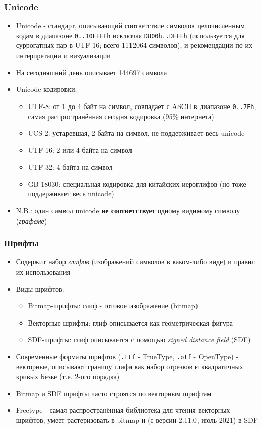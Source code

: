 \documentclass{beamer}
\begin{document}
\begin{frame}[fragile]
\frametitle{Unicode}
\begin{itemize}
\item Unicode - стандарт, описывающий соответствие символов целочисленным кодам в диапазоне \verb|0..10FFFFh| исключая \verb|D800h..DFFFh| (используется для суррогатных пар в UTF-16; всего 1112064 символов), и рекомендации по их интерпретации и визуализации
\pause
\item На сегодняшний день описывает 144697 символа
\pause
\item Unicode-кодировки:
\pause
\begin{itemize}
\item UTF-8: от 1 до 4 байт на символ, совпадает с ASCII в диапазоне \verb|0..7Fh|, самая распространённая сегодня кодировка (95\% интернета)
\pause
\item UCS-2: устаревшая, 2 байта на символ, не поддерживает весь unicode
\pause
\item UTF-16: 2 или 4 байта на символ
\pause
\item UTF-32: 4 байта на символ
\pause
\item GB 18030: специальная кодировка для китайских иероглифов (но тоже поддерживает весь unicode)
\end{itemize}
\pause
\item N.B.: один символ unicode \textbf{не соответствует} одному видимому символу (\textit{графеме})
\end{itemize}
\end{frame}

\begin{frame}[fragile]
\frametitle{Шрифты}
\begin{itemize}
\item Содержит набор \textit{глифов} (изображений символов в каком-либо виде) и правил их использования
\pause
\item Виды шрифтов:
\pause
\begin{itemize}
\item Bitmap-шрифты: глиф - готовое изображение (bitmap)
\pause
\item Векторные шрифты: глиф описывается как геометрическая фигура
\pause
\item SDF-шрифты: глиф описывается с помощью \textit{signed distance field} (SDF)
\end{itemize}
\pause
\item Современные форматы шрифтов (\verb|.ttf| - TrueType, \verb|.otf| - OpenType) - векторные, описывают границу глифа как набор отрезков и квадратичных кривых Безье (т.е. 2-ого порядка)
\pause
\item Bitmap и SDF шрифты часто строятся по векторным шрифтам
\pause
\item Freetype - самая распространённая библиотека для чтения векторных шрифтов; умеет растеризовать в bitmap и (с версии 2.11.0, июль 2021) в SDF
\end{itemize}
\end{frame}
\end{document}
